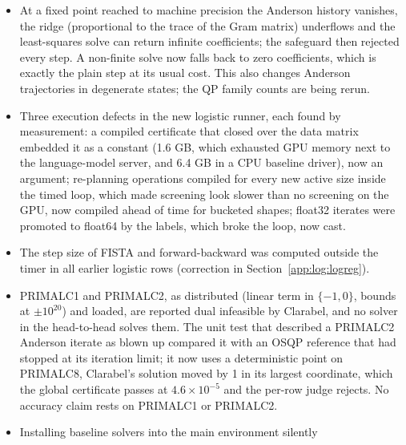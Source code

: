 \begin{itemize}
  (unflatten, apply the operator, flatten) made PDHG on a $1024\times1024$
  transport plan 35 times slower per step than the policy runner (1988
  against 56.5 microseconds, identical iterates to $6\times10^{-14}$). All
  composer times on transport, and the time ratios of the Condat-Vu
  compositions on QP, were inflated; evaluation counts were not. The state is
  now a pytree and the problem data are arguments of the compiled loop. On the
  transport creation loop plain PDHG went from 109.7 s to 4.27 s for the same
  69,248 evaluations (Section~\ref{app:log:ot}).
\item At a fixed point reached to machine precision the Anderson history
  vanishes, the ridge (proportional to the trace of the Gram matrix)
  underflows and the least-squares solve can return infinite coefficients;
  the safeguard then rejected every step. A non-finite solve now falls back to
  zero coefficients, which is exactly the plain step at its usual cost. This
  also changes Anderson trajectories in degenerate states; the QP family
  counts are being rerun.
\item Three execution defects in the new logistic runner, each found by
  measurement: a compiled certificate that closed over the data matrix
  embedded it as a constant (1.6 GB, which exhausted GPU memory next to the
  language-model server, and 6.4 GB in a CPU baseline driver), now an
  argument; re-planning operations compiled for every new active size inside
  the timed loop, which made screening look slower than no screening on the
  GPU, now compiled ahead of time for bucketed shapes; float32 iterates were
  promoted to float64 by the labels, which broke the loop, now cast.
\item The step size of FISTA and forward-backward was computed outside the
  timer in all earlier logistic rows (correction in
  Section~\ref{app:log:logreg}).
\item PRIMALC1 and PRIMALC2, as distributed (linear term in $\{-1, 0\}$,
  bounds at $\pm10^{20}$) and loaded, are reported dual infeasible by Clarabel,
  and no solver in the head-to-head solves them. The unit test that described
  a PRIMALC2 Anderson iterate as blown up compared it with an OSQP reference
  that had stopped at its iteration limit; it now uses a deterministic point on
  PRIMALC8, Clarabel's solution moved by 1 in its largest coordinate, which
  the global certificate passes at $4.6\times10^{-5}$ and the per-row judge
  rejects. No accuracy claim rests on PRIMALC1 or PRIMALC2.
\item Installing baseline solvers into the main environment silently

\end{itemize}
